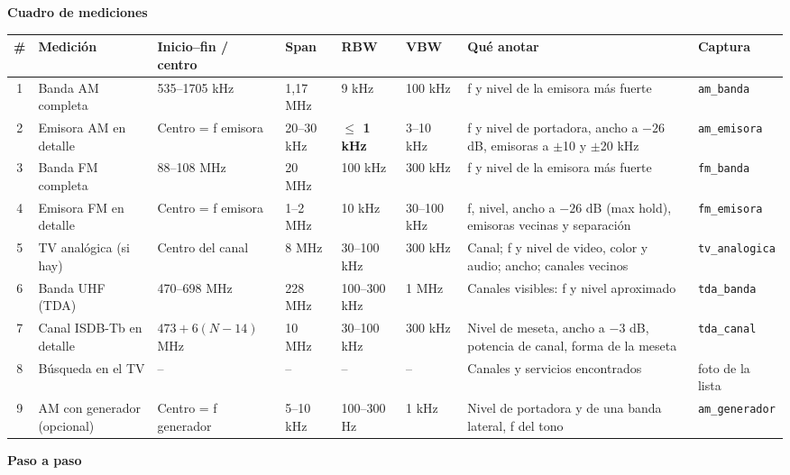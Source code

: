 \documentclass[10pt]{article}
\newcommand{\archivo}[1]{\texttt{\small #1}}
\begin{document}
\vspace{6pt}
\textbf{Cuadro de mediciones}\\[3pt]
{\small
\renewcommand{\arraystretch}{1.5}
\begin{tabular}{@{}c L{2.2cm} L{2.4cm} L{1.3cm} L{1.4cm} L{1.2cm} L{4.2cm} L{2.0cm}@{}}
    \toprule
    \textbf{\#} & \textbf{Medición} & \textbf{Inicio--fin / centro} & \textbf{Span} & \textbf{RBW} & \textbf{VBW} & \textbf{Qué anotar} & \textbf{Captura} \\
     & Banda AM completa & 535--1705 kHz & 1,17 MHz & 9 kHz & 100 kHz & f y nivel de la emisora más fuerte & \archivo{am\_banda} \\
     2 & Emisora AM en detalle & Centro = f emisora & 20--30 kHz & \textbf{$\leq$ 1 kHz} & 3--10 kHz & f y nivel de portadora, ancho a $-26$ dB, emisoras a $\pm$10 y $\pm$20 kHz & \archivo{am\_emisora} \\
    3 & Banda FM completa & 88--108 MHz & 20 MHz & 100 kHz & 300 kHz & f y nivel de la emisora más fuerte & \archivo{fm\_banda} \\
     4 & Emisora FM en detalle & Centro = f emisora & 1--2 MHz & 10 kHz & 30--100 kHz & f, nivel, ancho a $-26$ dB (max hold), emisoras vecinas y separación & \archivo{fm\_emisora} \\
    5 & TV analógica (si hay) & Centro del canal & 8 MHz & 30--100 kHz & 300 kHz & Canal; f y nivel de video, color y audio; ancho; canales vecinos & \archivo{tv\_analogica} \\
     6 & Banda UHF (TDA) & 470--698 MHz & 228 MHz & 100--300 kHz & 1 MHz & Canales visibles: f y nivel aproximado & \archivo{tda\_banda} \\
    7 & Canal ISDB-Tb en detalle & $473 + 6(N-14)$ MHz & 10 MHz & 30--100 kHz & 300 kHz & Nivel de meseta, ancho a $-3$ dB, potencia de canal, forma de la meseta & \archivo{tda\_canal} \\
     8 & Búsqueda en el TV & -- & -- & -- & -- & Canales y servicios encontrados & foto de la lista \\
    9 & AM con generador (opcional) & Centro = f generador & 5--10 kHz & 100--300 Hz & 1 kHz & Nivel de portadora y de una banda lateral, f del tono & \archivo{am\_generador} \\
    \bottomrule
\end{tabular}}

\newpage
\textbf{Paso a paso}
\end{document}
